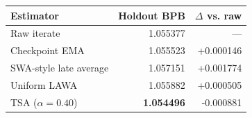\begin{tabular}{lrr}
\toprule
Estimator & Holdout BPB & $\Delta$ vs. raw \\
\midrule
Raw iterate & 1.055377 & --- \\
Checkpoint EMA & 1.055523 & +0.000146 \\
SWA-style late average & 1.057151 & +0.001774 \\
Uniform LAWA & 1.055882 & +0.000505 \\
TSA ($\alpha=0.40$) & \textbf{1.054496} & -0.000881 \\
\bottomrule
\end{tabular}
